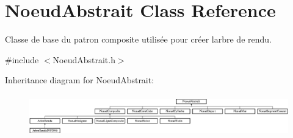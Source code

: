 \hypertarget{class_noeud_abstrait}{}\section{Noeud\+Abstrait Class Reference}
\label{class_noeud_abstrait}


Classe de base du patron composite utilisée pour créer l\textquotesingle{}arbre de rendu.  




{\ttfamily \#include $<$Noeud\+Abstrait.\+h$>$}

Inheritance diagram for Noeud\+Abstrait\+:\begin{figure}[H]
\begin{center}
\leavevmode
\includegraphics[height=1.866667cm]{class_noeud_abstrait}
\end{center}
\end{figure}
